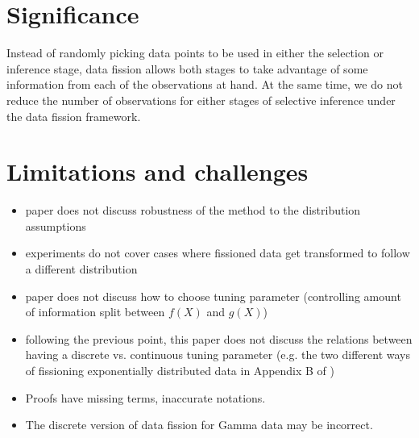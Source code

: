 \section{Significance}
Instead of randomly picking data points to be used in either the selection or inference stage, data fission allows both stages to take advantage of some information from each of the observations at hand. At the same time, we do not reduce the number of observations for either stages of selective inference under the data fission framework. 

\section{Limitations and challenges}

\begin{itemize}
\item paper does not discuss robustness of the method to the distribution assumptions
\item experiments do not cover cases where fissioned data get transformed to follow a different distribution
\item paper does not discuss how to choose tuning parameter (controlling amount of information split between $f(X)$ and $g(X)$)
\item following the previous point, this paper does not discuss the relations between having a discrete vs. continuous tuning parameter (e.g. the two different ways of fissioning exponentially distributed data in Appendix B of \cite{leiner2022data})
\item Proofs have missing terms, inaccurate notations.
\item The discrete version of data fission for Gamma data may be incorrect.
\end{itemize}
